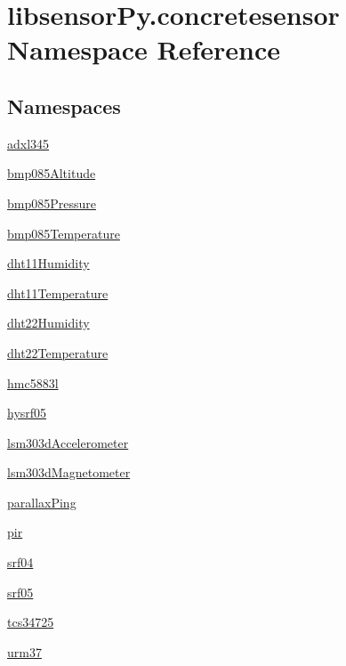 \hypertarget{namespacelibsensorPy_1_1concretesensor}{}\section{libsensor\+Py.\+concretesensor Namespace Reference}
\label{namespacelibsensorPy_1_1concretesensor}
\subsection*{Namespaces}
\begin{DoxyCompactItemize}
\item 
 \hyperlink{namespacelibsensorPy_1_1concretesensor_1_1adxl345}{adxl345}
\item 
 \hyperlink{namespacelibsensorPy_1_1concretesensor_1_1bmp085Altitude}{bmp085\+Altitude}
\item 
 \hyperlink{namespacelibsensorPy_1_1concretesensor_1_1bmp085Pressure}{bmp085\+Pressure}
\item 
 \hyperlink{namespacelibsensorPy_1_1concretesensor_1_1bmp085Temperature}{bmp085\+Temperature}
\item 
 \hyperlink{namespacelibsensorPy_1_1concretesensor_1_1dht11Humidity}{dht11\+Humidity}
\item 
 \hyperlink{namespacelibsensorPy_1_1concretesensor_1_1dht11Temperature}{dht11\+Temperature}
\item 
 \hyperlink{namespacelibsensorPy_1_1concretesensor_1_1dht22Humidity}{dht22\+Humidity}
\item 
 \hyperlink{namespacelibsensorPy_1_1concretesensor_1_1dht22Temperature}{dht22\+Temperature}
\item 
 \hyperlink{namespacelibsensorPy_1_1concretesensor_1_1hmc5883l}{hmc5883l}
\item 
 \hyperlink{namespacelibsensorPy_1_1concretesensor_1_1hysrf05}{hysrf05}
\item 
 \hyperlink{namespacelibsensorPy_1_1concretesensor_1_1lsm303dAccelerometer}{lsm303d\+Accelerometer}
\item 
 \hyperlink{namespacelibsensorPy_1_1concretesensor_1_1lsm303dMagnetometer}{lsm303d\+Magnetometer}
\item 
 \hyperlink{namespacelibsensorPy_1_1concretesensor_1_1parallaxPing}{parallax\+Ping}
\item 
 \hyperlink{namespacelibsensorPy_1_1concretesensor_1_1pir}{pir}
\item 
 \hyperlink{namespacelibsensorPy_1_1concretesensor_1_1srf04}{srf04}
\item 
 \hyperlink{namespacelibsensorPy_1_1concretesensor_1_1srf05}{srf05}
\item 
 \hyperlink{namespacelibsensorPy_1_1concretesensor_1_1tcs34725}{tcs34725}
\item 
 \hyperlink{namespacelibsensorPy_1_1concretesensor_1_1urm37}{urm37}
\end{DoxyCompactItemize}
